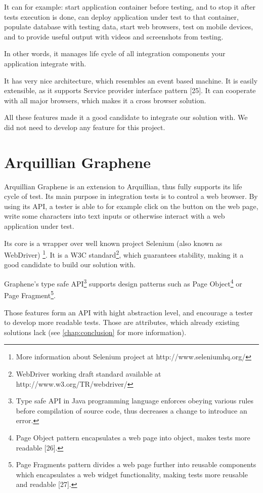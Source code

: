 \documentclass[11pt,oneside,final]{fithesis2}
\begin{document}
It can for example: start application container before testing, and to stop it after tests execution 
is done, can deploy application under test to that container, populate database with testing data, 
start web browsers, test on mobile devices, and to provide useful output with videos and screenshots 
from testing.

In other words, it manages life cycle of all integration components your application integrate with.

It has very nice architecture, which resembles an event based machine. It is easily extensible, as it
supports Service provider interface pattern [25]. It can cooperate with all major browsers, which makes
it a cross browser solution. 

All these features made it a good candidate to integrate our solution with. We did not need to develop any
feature for this project.
  
\section{Arquillian Graphene}
Arquillian Graphene is an extension to Arquillian, thus fully supports its life cycle of test. Its main
purpose in integration tests is to control a web browser. By using its API, a tester is able to for example
click on the button on the web page, write some characters into text inputs or otherwise interact with
a web application under test.

Its core is a wrapper over well known project Selenium (also known as WebDriver) 
\footnote{More information about Selenium project at http://www.seleniumhq.org/}. It is a W3C 
standard\footnote{WebDriver working draft standard available at http://www.w3.org/TR/webdriver/},
which guarantees stability, making it a good candidate to build our solution with.

Graphene's type safe API\footnote{Type safe API in Java programming language enforces obeying various rules
before compilation of source code, thus decreases a change to introduce an error.} supports design patterns
such as Page Object\footnote{Page Object pattern encapsulates a web page into object, makes tests
more readable [26].} or Page Fragment\footnote{Page Fragments pattern divides a web page further into reusable 
components which encapsulates a web widget functionality, making tests more reusable and readable [27].}.

Those features form an API with hight abstraction level, and encourage a tester to develop more readable
tests. Those are attributes, which already existing solutions lack (see \ref{chap:conclusion} for more
information).
\end{document}
